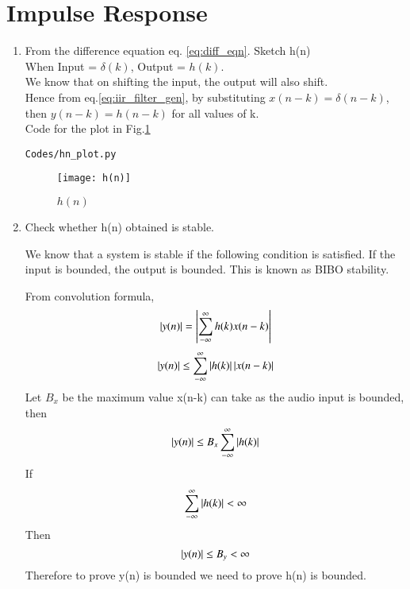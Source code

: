 \documentclass[journal,12pt,twocolumn]{IEEEtran}
\renewcommand\thesection{\arabic{section}}
\begin{document}
\section{Impulse Response}
\begin{enumerate}[label=\thesection.\arabic*,ref=\thesection.\theenumi]
\item
From the difference equation eq. \ref{eq:diff_eqn}. Sketch h(n)
\label{prob:h(n)}
\\
\solution
When Input  = $\delta(k)$, Output = $h(k)$. \\We know that on shifting the input, the output will also shift.\\
Hence from eq.\ref{eq:iir_filter_gen}, 
by substituting $x(n-k) = \delta(n-k)$, then $y(n-k) = h(n-k)$ for all values of k.\\
Code for the plot in Fig.\ref{fig:h(n)}
\begin{lstlisting}
Codes/hn_plot.py
\end{lstlisting}
\begin{figure}[!ht]
\centering
\texttt{[image: h(n)]}
\caption{$h(n)$}
\label{fig:h(n)}
\end{figure}
\item Check whether h(n) obtained is stable.
\\
\solution

We know that a system is stable if the following condition is satisfied. If the input is bounded, the output is bounded. This is known as BIBO stability.

From convolution formula,
\begin{equation}
\left\vert y(n)\right\vert = \left\vert\sum_{-\infty}^{\infty} h(k)x(n-k)\right\vert
\end{equation}
\begin{equation}
\left\vert y(n)\right\vert \leq \sum_{-\infty}^{\infty} \left\vert h(k)\right\vert\left\vert x(n-k)\right\vert
\end{equation}
Let $B_{x}$ be the maximum value x(n-k) can take as the audio input is bounded, then
\begin{equation}
\left\vert y(n)\right\vert \leq B_{x}\sum_{-\infty}^{\infty} \left\vert h(k)\right\vert
\end{equation}
If
\begin{equation}
\sum_{-\infty}^{\infty} \left\vert h(k)\right\vert < \infty
\end{equation}
Then
\begin{equation}
\left\vert y(n)\right\vert \leq B_{y} < \infty
\end{equation}
Therefore to prove y(n) is bounded we need to prove h(n) is bounded.


\end{enumerate}
\end{document}
